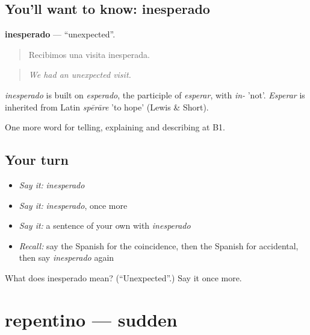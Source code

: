 \subsection*{You'll want to know: inesperado}
\textbf{inesperado} — \textquotedblleft{}unexpected\textquotedblright{}.

\begin{quote}
Recibimos una visita inesperada.
\end{quote}

\begin{quote}
\emph{We had an unexpected visit.}
\end{quote}

\begin{cousinweb}
\emph{inesperado} is built on \emph{esperado}, the participle of \emph{esperar}, with \emph{in-} 'not'. \emph{Esperar} is inherited from Latin \emph{spērāre} 'to hope' (Lewis \& Short).
\end{cousinweb}

\begin{grammarlens}[title={What you've built}]
One more word for telling, explaining and describing at B1.
\end{grammarlens}

\subsection*{Your turn}
\begin{itemize}
\raggedright
  \item \emph{Say it:} \emph{inesperado}
  \item \emph{Say it:} \emph{inesperado}, once more
  \item \emph{Say it:} a sentence of your own with \emph{inesperado}
  \item \emph{Recall:} say the Spanish for the coincidence, then the Spanish for accidental, then say \emph{inesperado} again
\end{itemize}

\begin{tcolorbox}[breakable,colback=teal!4,colframe=teal!35!black,title={Before you move on}]
What does inesperado mean? (\textquotedblleft{}Unexpected\textquotedblright{}.) Say it once more.
\end{tcolorbox}
\section[repentino]{repentino — sudden}

\label{lesson:ES-C533-repentino}



